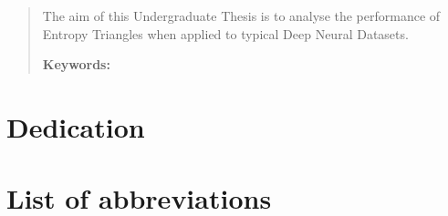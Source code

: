 \documentclass[12pt]{report}
\begin{document}
\newpage %
\thispagestyle{empty}
\mbox{}

\renewcommand\abstractname{\large\uppercase{Summary}}
\begin{abstract}
\thispagestyle{plain}
\setcounter{page}{3}
	
The aim of this Undergraduate Thesis is to analyse the performance of Entropy Triangles when applied to typical Deep Neural Datasets.
	
	\textbf{Keywords:}
	
	\vfill
\end{abstract}

	\newpage %
	\thispagestyle{empty}
	\mbox{}

\chapter*{Dedication}


\setcounter{page}{5}
	
		
	\vfill
	
	\newpage %
	\thispagestyle{empty}
	\mbox{}
	


\tableofcontents
\thispagestyle{fancy}

\newpage %
\thispagestyle{empty}
\mbox{}

\listoffigures
\thispagestyle{fancy}

\newpage %
\thispagestyle{empty}
\mbox{}

\listoftables
\thispagestyle{fancy}

\newpage %
\thispagestyle{empty}
\mbox{}

\chapter*{List of abbreviations}

\end{document}
